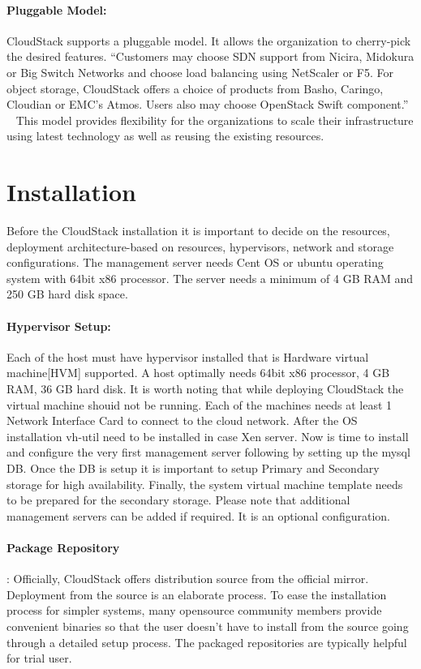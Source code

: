 \paragraph {Pluggable Model:} CloudStack supports a pluggable model. It 
allows the organization to cherry-pick the desired features. ``Customers may 
choose SDN support from Nicira, Midokura or Big Switch Networks and choose load
balancing using NetScaler or F5. For object storage, CloudStack offers a choice of
products from Basho, Caringo, Cloudian or EMC's Atmos. Users also may choose
OpenStack Swift component.'' ~\cite{hid-sp18-417-www-cloudstack-model}
This model provides flexibility for the organizations to scale their infrastructure 
using latest technology as well as reusing the existing resources.

\section{Installation}

Before the CloudStack installation it is important to decide on the resources,
deployment architecture-based on resources, hypervisors, network and storage 
configurations. The management server needs Cent OS or ubuntu operating system
with 64bit x86 processor. The server needs a minimum of 4 GB RAM and 250 GB
hard disk space. 

\paragraph {Hypervisor Setup:} Each of the host must have hypervisor installed that is Hardware
virtual machine[HVM] supported. A host optimally needs 64bit x86 processor, 4 GB
RAM, 36 GB hard disk. It is worth noting that while deploying CloudStack the virtual 
machine shouid not be running. Each of the machines needs at least 1 Network Interface Card 
to connect to the cloud network.  After the OS installation vh-util need to be installed 
in case Xen server. Now is time to install and configure the very first management 
server following by setting up the mysql DB. Once the DB is setup it is important to 
setup Primary and Secondary storage for high availability. Finally, the system virtual 
machine template needs to be prepared for the secondary storage. Please note
 that additional management servers can be added if required. It is an optional configuration.

\paragraph {Package Repository}: Officially, CloudStack offers distribution source from the 
official mirror. Deployment from the source is an elaborate process. To ease the installation 
process for simpler systems, many opensource community members provide convenient binaries
so that the user doesn’t have to install from the source going through a detailed setup 
process. The packaged repositories are typically helpful for trial user. ~\cite{hid-sp18-417-www-cloudstack-installation}


